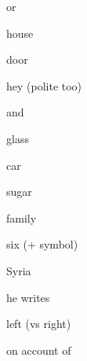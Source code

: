 

\begin{flashcard}{\LARGE or}
\LARGE {}
\end{flashcard}
\begin{flashcard}{\LARGE house}
\LARGE {}
\end{flashcard}
\begin{flashcard}{\LARGE door}
\LARGE {}
\end{flashcard}
\begin{flashcard}{\LARGE hey (polite too)}
\LARGE {}
\end{flashcard}
\begin{flashcard}{\LARGE and}
\LARGE {}
\end{flashcard}
\begin{flashcard}{\LARGE glass}
\LARGE {}
\end{flashcard}
\begin{flashcard}{\LARGE car}
\LARGE {}
\end{flashcard}
\begin{flashcard}{\LARGE sugar}
\LARGE {}
\end{flashcard}
\begin{flashcard}{\LARGE family}
\LARGE {}
\end{flashcard}
\begin{flashcard}{\LARGE six (+ symbol)}
\LARGE {}
\end{flashcard}
\begin{flashcard}{\LARGE Syria}
\LARGE {}
\end{flashcard}
\begin{flashcard}{\LARGE he writes}
\LARGE {}
\end{flashcard}
\begin{flashcard}{\LARGE left (vs right)}
\LARGE {}
\end{flashcard}
\begin{flashcard}{\LARGE on account of}
\LARGE {}
\end{flashcard}

